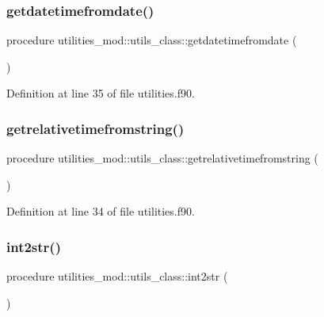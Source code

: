 \subsubsection{\texorpdfstring{getdatetimefromdate()}{getdatetimefromdate()}}
{\footnotesize\ttfamily procedure utilities\+\_\+mod\+::utils\+\_\+class\+::getdatetimefromdate (\begin{DoxyParamCaption}{ }\end{DoxyParamCaption})\hspace{0.3cm}{\ttfamily [private]}}



Definition at line 35 of file utilities.\+f90.

\mbox{\label{structutilities__mod_1_1utils__class_a7c6279ee9c593690a6f82a97be3a4699}} 
\subsubsection{\texorpdfstring{getrelativetimefromstring()}{getrelativetimefromstring()}}
{\footnotesize\ttfamily procedure utilities\+\_\+mod\+::utils\+\_\+class\+::getrelativetimefromstring (\begin{DoxyParamCaption}{ }\end{DoxyParamCaption})\hspace{0.3cm}{\ttfamily [private]}}



Definition at line 34 of file utilities.\+f90.

\mbox{\label{structutilities__mod_1_1utils__class_ae3a7fea394d64f5f4592504841b07777}} 
\subsubsection{\texorpdfstring{int2str()}{int2str()}}
{\footnotesize\ttfamily procedure utilities\+\_\+mod\+::utils\+\_\+class\+::int2str (\begin{DoxyParamCaption}{ }\end{DoxyParamCaption})\hspace{0.3cm}{\ttfamily [private]}}



